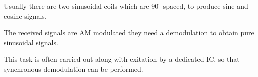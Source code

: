 \documentclass[main]{subfiles}
\begin{document}
    Usually there are two sinusoidal coils which are $90^\circ$ spaced, to 
    produce sine and cosine signals.

    The received signals are AM modulated  they need a demodulation to obtain 
    pure sinusoidal signals.

    This task is often carried out along with exitation by a dedicated \ac{IC}, 
    so that synchronous demodulation can be performed.
    
\end{document}
